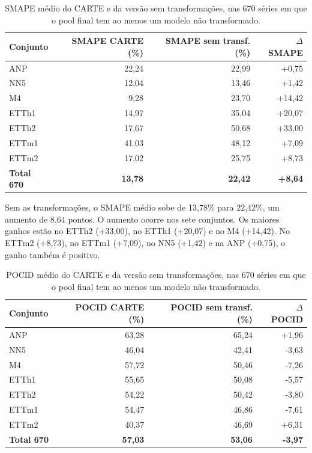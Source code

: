 \begin{table}[H]
\centering
\caption[SMAPE com e sem transformações (670 séries).]{SMAPE médio do CARTE e da versão sem transformações, nas 670 séries em que o pool final tem ao menos um modelo não transformado.}
\label{tab:sintese-transformacoes-remocao-smape}
\small
\begin{tabular}{@{}lrrr@{}}
\toprule
\textbf{Conjunto} & \textbf{SMAPE CARTE (\%)} & \textbf{SMAPE sem transf. (\%)} & \textbf{$\Delta$ SMAPE} \\
\midrule
ANP    & 22,24 & 22,99 & +0,75 \\
NN5    & 12,04 & 13,46 & +1,42 \\
M4     & 9,28  & 23,70 & +14,42 \\
ETTh1  & 14,97 & 35,04 & +20,07 \\
ETTh2  & 17,67 & 50,68 & +33,00 \\
ETTm1  & 41,03 & 48,12 & +7,09 \\
ETTm2  & 17,02 & 25,75 & +8,73 \\
\midrule
\textbf{Total 670} & \textbf{13,78} & \textbf{22,42} & \textbf{+8,64} \\
\bottomrule
\end{tabular}
\end{table}

Sem as transformações, o SMAPE médio sobe de 13,78\% para 22,42\%, um aumento de 8,64 pontos. O aumento ocorre nos sete conjuntos. Os maiores ganhos estão no ETTh2 (+33,00), no ETTh1 (+20,07) e no M4 (+14,42). No ETTm2 (+8,73), no ETTm1 (+7,09), no NN5 (+1,42) e na ANP (+0,75), o ganho também é positivo.

\begin{table}[H]
\centering
\caption[POCID com e sem transformações (670 séries).]{POCID médio do CARTE e da versão sem transformações, nas 670 séries em que o pool final tem ao menos um modelo não transformado.}
\label{tab:sintese-transformacoes-remocao-pocid}
\small
\begin{tabular}{@{}lrrr@{}}
\toprule
\textbf{Conjunto} & \textbf{POCID CARTE (\%)} & \textbf{POCID sem transf. (\%)} & \textbf{$\Delta$ POCID} \\
\midrule
ANP    & 63,28 & 65,24 & +1,96 \\
NN5    & 46,04 & 42,41 & -3,63 \\
M4     & 57,72 & 50,46 & -7,26 \\
ETTh1  & 55,65 & 50,08 & -5,57 \\
ETTh2  & 54,22 & 50,42 & -3,80 \\
ETTm1  & 54,47 & 46,86 & -7,61 \\
ETTm2  & 40,37 & 46,69 & +6,31 \\
\midrule
\textbf{Total 670} & \textbf{57,03} & \textbf{53,06} & \textbf{-3,97} \\
\bottomrule
\end{tabular}
\end{table}

